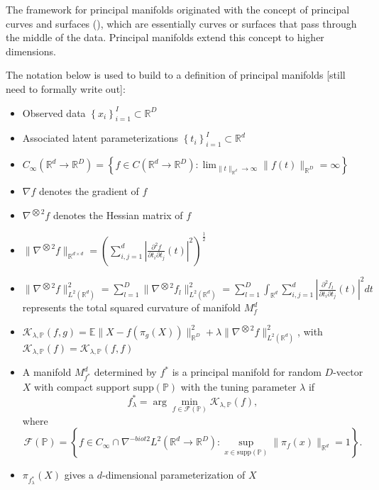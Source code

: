 \documentclass[11pt,reqno]{article}
\begin{document}
The framework for principal manifolds originated with the concept of principal curves and surfaces (\cite{hastiePrincipalCurves1989}), which are essentially curves or surfaces that pass through the middle of the data. Principal manifolds extend this concept to higher dimensions.

The notation below is used to build to a definition of principal manifolds [still need to formally write out]:
\begin{itemize}
  \item Observed data $\left\{x_i\right\}_{i=1}^I \subset \mathbb{R}^D$
  \item Associated latent parameterizations $\left\{t_i\right\}_{i=1}^I \subset \mathbb{R}^d$
  \item $C_{\infty}\left(\mathbb{R}^d \to \mathbb{R}^D\right) = \left\{f \in C(\mathbb{R}^d \to \mathbb{R}^D): \lim_{\|t\|_{\mathbb{R}^d} \to \infty} \|f(t)\|_{\mathbb{R}^D} = \infty\right\}$ 
  \item $\nabla f$ denotes the gradient of $f$
  \item $\nabla^{\bigotimes 2}f$ denotes the Hessian matrix of $f$
  \item $\|\nabla^{\bigotimes 2}f\|_{\mathbb{R}^{d \times d}} = \left(\sum_{i, j = 1}^{d} |\frac{\partial^2f}{\partial t_i \partial t_j}(t)|^2\right)^{\frac{1}{2}}$
  \item $\|\nabla^{\bigotimes 2}f\|_{L^2(\mathbb{R}^{d})}^2 = \sum_{l = 1}^{D}\|\nabla^{\bigotimes 2}f_l\|_{L^2(\mathbb{R}^{d})}^2 = \sum_{l=1}^{D}\int_{\mathbb{R}^d}\sum_{i,j = 1}^{d}|\frac{\partial^2f_l}{\partial t_i \partial t_j}(t)|^2dt$ represents the total squared curvature of manifold $M_f^{d}$
  \item $\mathcal{K}_{\lambda, \mathbb{P}}(f, g) = \mathbb{E}\|X - f(\pi_{g}(X))\|_{\mathbb{R}^{D}}^2 + \lambda\|\nabla^{\bigotimes 2}f\|_{L^2(\mathbb{R}^{d})}^2$, with $\mathcal{K_{\lambda, \mathbb{P}}}(f) = \mathcal{K}_{\lambda, \mathbb{P}}(f, f)$
  \item A manifold $M_{f^*}^{d}$ determined by $f^*$ is a principal manifold for random $D$-vector $X$ with compact support $\text{supp}(\mathbb{P})$ with the tuning parameter $\lambda$ if \[%
    f_{\lambda}^{*} = \arg \min_{f \in \mathcal{F}(\mathbb{P})}\mathcal{K}_{\lambda, \mathbb{P}}(f)
  ,\]%
    where \[%
      \mathcal{F}(\mathbb{P}) = \left\{f \in C_{\infty} \cap \nabla^{-biot 2}L^2(\mathbb{R}^{d} \to \mathbb{R}^{D}): \sup_{x \in \text{supp}(\mathbb{P})}\|\pi_f(x)\|_{\mathbb{R}^{d}} = 1\right\}
    .\]%
  \item $\pi_{f_\lambda^{*}}(X)$ gives a $d$-dimensional parameterization of $X$
\end{itemize}
\end{document}
